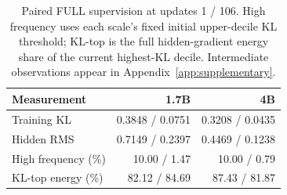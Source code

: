 \begin{table}[!htbp]
\centering
\caption{Paired FULL supervision at updates 1 / 106. High frequency uses each scale's fixed initial upper-decile KL threshold; KL-top is the full hidden-gradient energy share of the current highest-KL decile. Intermediate observations appear in Appendix~\ref{app:supplementary}.}
\label{tab:supervision_summary}
\small
\setlength{\tabcolsep}{3pt}
\begin{tabular}{lrr}
\toprule
Measurement & 1.7B & 4B \\
\midrule
Training KL & 0.3848 / 0.0751 & 0.3208 / 0.0435 \\
Hidden RMS & 0.7149 / 0.2397 & 0.4469 / 0.1238 \\
High frequency (\%) & 10.00 / 1.47 & 10.00 / 0.79 \\
KL-top energy (\%) & 82.12 / 84.69 & 87.43 / 81.87 \\
\bottomrule
\end{tabular}
\end{table}
